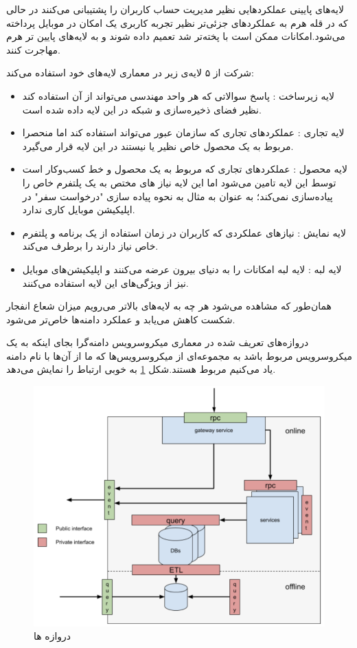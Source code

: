 لایه‌های پایینی عملکرد‌هایی نظیر مدیریت حساب کاربران را پشتیبانی می‌کنند در حالی که در قله هرم به عملکرد‌های جزئی‌تر نظیر تجربه کاربری یک امکان در موبایل پرداخته می‌شود.امکانات ممکن است با پخته‌تر شد تعمیم داده شوند و به لایه‌های پایین تر هرم مهاجرت کنند.

شرکت  از ۵ لایه‌ی زیر در معماری لایه‌های خود استفاده می‌کند:
\begin{itemize}
\item
لایه زیرساخت : پاسخ سوالاتی که هر واحد مهندسی می‌تواند از آن استفاده کند نظیر فضای ذخیره‌سازی و شبکه در این لایه داده شده است.
\item
لایه تجاری : عملکرد‌های تجاری که سازمان عبور می‌تواند استفاده کند اما منحصرا مربوط به یک محصول خاص نظیر  یا  نیستند در این لایه قرار می‌گیرد.
\item
لایه محصول  : عملکرد‌های تجاری که مربوط به یک محصول و خط کسب‌و‌کار است توسط این لایه تامین می‌شود اما این لایه نیاز های مختص به یک پلتفرم خاص را پیاده‌سازی نمی‌کند؛ به عنوان به مثال به نحوه پیاده سازی "درخواست سفر" در اپلیکیشن موبایل کاری ندارد.
\item
لایه نمایش  : نیاز‌های عملکردی که کاربران در زمان استفاده از یک برنامه و پلتفرم خاص نیاز دارند را برطرف می‌کند.
\item
لایه لبه  : لایه لبه امکانات  را به دنیای بیرون عرضه می‌کنند و اپلیکیشن‌های موبایل نیز از ویژگی‌های این لایه استفاده می‌کنند.
\end{itemize}

همان‌طور که مشاهده می‌شود هر چه به لایه‌های بالاتر می‌رویم میزان شعاع انفجار شکست کاهش می‌یابد و عملکرد دامنه‌ها خاص‌تر می‌شود.

دروازه‌های تعریف شده در معماری میکروسرویس دامنه‌گرا بجای اینکه به یک میکروسرویس مربوط باشد به مجموعه‌ای از میکروسرویس‌ها که ما از آن‌ها با نام دامنه یاد می‌کنیم مربوط هستند.شکل \ref{fig:gateways} به خوبی ارتباط را نمایش می‌دهد.‍

\begin{figure}[h]
\centering
\includegraphics[scale=0.5]{gateways.png}
\caption{دروازه ها}
\label{fig:gateways}
\end{figure}

